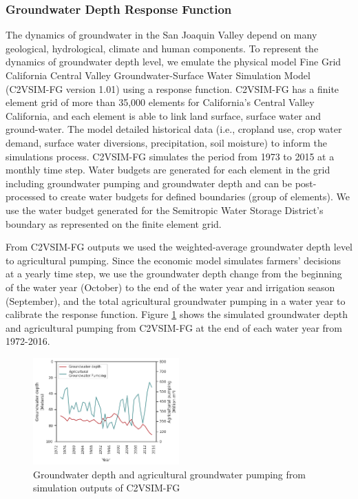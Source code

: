 \documentclass[a4paper,fleqn]{cas-sc}
\begin{document}
\subsubsection{Groundwater Depth Response Function}

The dynamics of groundwater in the San Joaquin Valley depend on many geological, hydrological, climate and human components. To represent the dynamics of groundwater depth level, we emulate the physical model Fine Grid California Central Valley Groundwater-Surface Water Simulation Model (C2VSIM-FG version 1.01) \citep{dwr_c2vsimfg_2021} using a response function. C2VSIM-FG has a finite element grid of more than 35,000 elements for California’s Central Valley California, and each element is able to link land surface, surface water and ground-water. The model detailed historical data (i.e., cropland use, crop water demand, surface water diversions, precipitation, soil moisture) to inform the simulations process. C2VSIM-FG simulates the period from 1973 to 2015 at a monthly time step. Water budgets are generated for each element in the grid including groundwater pumping and groundwater depth and can be post-processed to create water budgets for defined boundaries (group of elements). We use the water budget generated for the Semitropic Water Storage District's boundary as represented on the finite element grid. 

From C2VSIM-FG outputs we used the weighted-average groundwater depth level to agricultural pumping. Since the economic model simulates farmers’ decisions at a yearly time step, we use the groundwater depth change from the beginning of the water year (October) to the end of the water year and irrigation season (September), and the total agricultural groundwater pumping in a water year to calibrate the response function. Figure \ref{fig:3} shows the simulated groundwater depth and agricultural pumping from C2VSIM-FG at the end of each water year from 1972-2016. 

\begin{figure}[ht]
    \centering
    \includegraphics[width=0.5\textwidth]{c2vsim_semitropic.png}
    \caption{Groundwater depth and agricultural groundwater pumping from simulation outputs of C2VSIM-FG \citep{dwr_c2vsimfg_2021}}
    \label{fig:3}
\end{figure}
\end{document}
